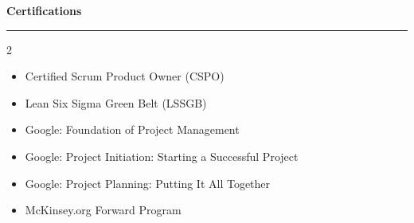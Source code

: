\documentclass[9pt,letterpaper]{article} %
\newenvironment{rSection}[1]{ %
  \sectionskip
 \textbf{\Large #1} %
  \sectionlineskip
  \hrule %
  \begin{list}{}{ %
    \setlength{\leftmargin}{-0em} %
  }
  \item[]
}{
  \end{list}
}
\def\sectionlineskip{\smallskip} %
\def\sectionskip{} %
\begin{document}
\begin{rSection}{Certifications}
\begin{multicols}{2}
\begin{itemize}[left=-1.5em, labelsep=.1cm, labelwidth=.2cm, itemsep=0.0em, topsep=0pt]
\item Certified Scrum Product Owner (CSPO)
\item Lean Six Sigma Green Belt (LSSGB)
\item Google: Foundation of Project Management
\item Google: Project Initiation: Starting a Successful Project
\item Google: Project Planning: Putting It All Together
\item McKinsey.org Forward Program
\end{itemize}
\end{multicols}
\end{rSection}
\end{document}
